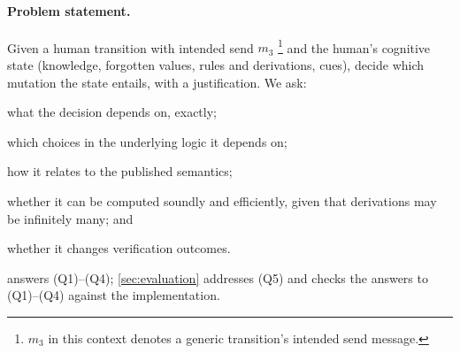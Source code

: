 \paragraph{Problem statement.} Given a human transition with intended send $m_3$ \footnote{$m_3$ in this context denotes a generic transition's intended send message.} and the human's cognitive state (knowledge, forgotten values, rules and derivations, cues), decide which mutation the state entails, with a justification. We ask:
\begin{enumerate*}[label=(Q\arabic*)]
\item what the decision depends on, exactly;
\item which choices in the underlying logic it depends on;
\item how it relates to the published semantics;
\item whether it can be computed soundly and efficiently, given that derivations may be infinitely many; and
\item whether it changes verification outcomes.
\end{enumerate*}

 answers (Q1)--(Q4); \cref{sec:evaluation} addresses (Q5) and checks the answers to (Q1)--(Q4) against the implementation.
